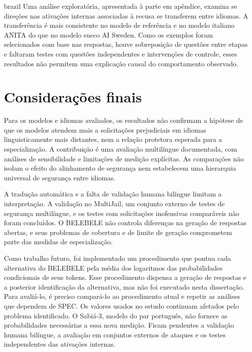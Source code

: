 \begin{otherlanguage*}{brazil}
Uma análise exploratória, apresentada à parte em apêndice, examina se direções nas ativações internas associadas à recusa se transferem entre idiomas. A transferência é mais consistente no modelo de referência e no modelo italiano ANITA do que no modelo sueco AI Sweden. Como os exemplos foram selecionados com base nas respostas, houve sobreposição de questões entre etapas e faltaram testes com questões independentes e intervenções de controle, esses resultados não permitem uma explicação causal do comportamento observado.

\section*{Considerações finais}
Para os modelos e idiomas avaliados, os resultados não confirmam a hipótese de que os modelos atendem mais a solicitações prejudiciais em idiomas linguisticamente mais distantes, nem a relação protetora esperada para a especialização. A contribuição é uma avaliação multilíngue documentada, com análises de sensibilidade e limitações de medição explícitas. As comparações não isolam o efeito do alinhamento de segurança nem estabelecem uma hierarquia universal de segurança entre idiomas.

A tradução automática e a falta de validação humana bilíngue limitam a interpretação. A validação no MultiJail, um conjunto externo de testes de segurança multilíngue, e os testes com solicitações inofensivas comparáveis não foram concluídos. O BELEBELE não controla diferenças na geração de respostas abertas, e seus problemas de cobertura e de limite de geração comprometem parte das medidas de especialização.

Como trabalho futuro, foi implementado um procedimento que pontua cada alternativa do BELEBELE pela média dos logaritmos das probabilidades condicionais de seus tokens. Esse procedimento dispensa a geração de respostas e a posterior identificação da alternativa, mas não foi executado nesta dissertação. Para avaliá-lo, é preciso compará-lo ao procedimento atual e repetir as análises que dependem de SPEC. Os valores usados no estudo continuam afetados pelo problema identificado. O Sabiá-3, modelo do par português, não fornece as probabilidades necessárias a essa nova medição. Ficam pendentes a validação humana bilíngue, a avaliação em conjuntos externos de ataques e os testes independentes das ativações internas.

\begingroup
\setlength{\parindent}{0pt}
\SingleSpacing
{}
\par
\endgroup
\end{otherlanguage*}
